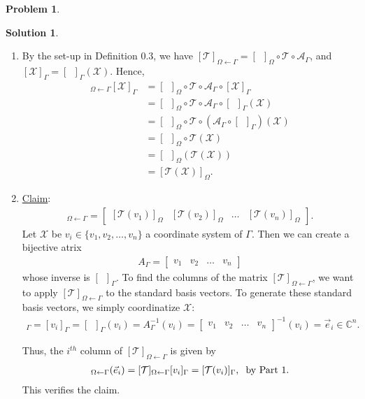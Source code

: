 \documentclass{article}
\theoremstyle{definition}
\newtheorem*{prob*}{Problem}
\newtheorem*{sln*}{Solution}
\newcommand{\T}{\mathcal{T}}
\begin{document}
\begin{prob*}
\begin{sln*}
\begin{enumerate}
			
			\item By the set-up in Definition 0.3, we have $[\T]_{\Omega\leftarrow \Gamma} = [\,\,\,]_\Omega\circ\T\circ \mathcal{A}_\Gamma$, and $[\mathcal{X}]_\Gamma = [\,\,\,]_\Gamma(\mathcal{X})$. Hence,
			\begin{align*}
			[\T]_{\Omega\leftarrow \Gamma}[\mathcal{X}]_\Gamma 
			&= [\,\,\,]_\Omega\circ\T\circ \mathcal{A}_\Gamma \circ [\mathcal{X}]_\Gamma \\
			&= [\,\,\,]_\Omega\circ\T\circ \mathcal{A}_\Gamma \circ [\,\,\,]_\Gamma(\mathcal{X})\\
			&= [\,\,\,]_\Omega\circ\T\circ \left(\mathcal{A}_\Gamma \circ [\,\,\,]_\Gamma\right)(\mathcal{X})\\
			&= [\,\,\,]_\Omega\circ\T(\mathcal{X})\\
			&= [\,\,\,]_\Omega\left(\T(\mathcal{X})\right)\\
			&= [\mathcal{T}(\mathcal{X})]_\Omega.
			\end{align*}
			
			
			
			
			\item \underline{Claim}:
			\begin{align*}
			[\T]_{\Omega\leftarrow\Gamma} = \begin{bmatrix}
			[\T(v_1)]_\Omega & [\T(v_2)]_\Omega & \dots & [\T(v_n)]_\Omega
			\end{bmatrix}.
			\end{align*}
			Let $\mathcal{X}$ be $v_i \in \{v_1,v_2,\dots,v_n\}$ a coordinate system of $\Gamma$. Then we can create a bijective atrix 
			\begin{align*}
			A_\Gamma = \begin{bmatrix}
			v_1 & v_2 & \dots & v_n
			\end{bmatrix}
			\end{align*}
			whose inverse is $[\,\,\,]_\Gamma$. To find the columns of the matrix $[\T]_{\Omega\leftarrow\Gamma}$, we want to apply $[\T]_{\Omega\leftarrow\Gamma}$ to the standard basis vectors. To generate these standard basis vectors, we simply coordinatize $\mathcal{X}$:
			\begin{align*}
			[\mathcal{X}]_\Gamma = [v_i]_\Gamma = [\,\,\,]_\Gamma(v_i)=A^{-1}_\Gamma(v_i) = \begin{bmatrix}
			v_1&v_2&\dots&v_n
			\end{bmatrix}^{-1}(v_i) =  \vec{e}_i \in \mathbb{C}^n.
			\end{align*} 
			 
			Thus, the $i^{th}$ column of $[\T]_{\Omega\leftarrow \Gamma}$ is given by 
			\begin{align*}
			[\T]_{\Omega\leftarrow \Gamma}(\vec{e}_i) = [\T]_{\Omega\leftarrow \Gamma}[v_i]_\Gamma = [\T(v_i)]_\Gamma, \hspace{0.2cm}\text{by Part 1}. 
			\end{align*}
			This verifies the claim.\\







\end{enumerate}
\end{sln*}
\end{prob*}
\end{document}
